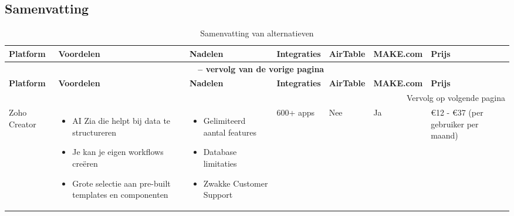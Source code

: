 \subsection{Samenvatting}%
\label{subsec:samenvatting}
\begin{longtable}{p{2.2cm} p{2.4cm} p{2.4cm} p{2.2cm} p{2.2cm} p{2.2cm} p{2.2cm}}
    \caption{Samenvatting van alternatieven} \label{samenvatting-alternatieven} \\
    \toprule
    \textbf{Platform} & \textbf{Voordelen} & \textbf{Nadelen} & \textbf{Integraties} & \textbf{AirTable} & \textbf{MAKE.com} & \textbf{Prijs} \\
    \midrule
    \endfirsthead

    \multicolumn{7}{c}{{\bfseries \tablename\ \thetable{} -- vervolg van de vorige pagina}} \\
    \toprule
    \textbf{Platform} & \textbf{Voordelen} & \textbf{Nadelen} & \textbf{Integraties} & \textbf{AirTable} & \textbf{MAKE.com} & \textbf{Prijs} \\
    \midrule
    \endhead

    \midrule
    \multicolumn{7}{r}{{Vervolg op volgende pagina}} \\
    \endfoot

    \bottomrule
    \endlastfoot

    Zoho Creator & 
    \begin{itemize}
        \item AI Zia die helpt bij data te structureren
        \item Je kan je eigen workflows creëren
        \item Grote selectie aan pre-built templates en componenten
    \end{itemize} & 
    \begin{itemize}
        \item Gelimiteerd aantal features
        \item Database limitaties
        \item Zwakke Customer Support
    \end{itemize} &
    600+ apps &
    Nee &
    Ja &
    €12 - €37 (per gebruiker per maand)\\


\end{longtable}
